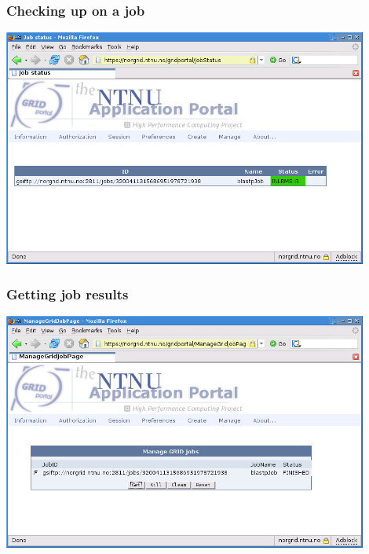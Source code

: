 \documentclass{beamer}
\begin{document}
\begin{frame}
  \frametitle{Checking up on a job}

	\begin{center}
		\includegraphics[width=0.9\textwidth]{gridportal_jobstatus.png}
	\end{center}
\end{frame}

\begin{frame}
  \frametitle{Getting job results}

	\begin{center}
		\includegraphics[width=0.9\textwidth]{gridportal_getjob.png}
	\end{center}
\end{frame}
\end{document}
